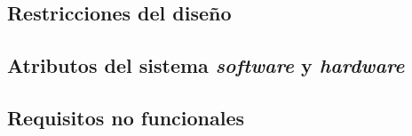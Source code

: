 % 

\subsection{Restricciones del diseño}


\subsection{Atributos del sistema \textit{software} y \textit{hardware}}


\subsection{Requisitos no funcionales}


% 

